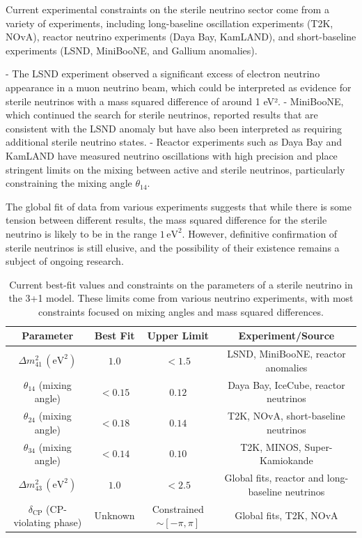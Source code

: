 \documentclass[a4paper,12pt,numbered]{article}
\begin{document}
Current experimental constraints on the sterile neutrino sector come from a variety of experiments, including long-baseline oscillation experiments (T2K, NOvA), reactor neutrino experiments (Daya Bay, KamLAND), and short-baseline experiments (LSND, MiniBooNE, and Gallium anomalies). 

- The LSND experiment observed a significant excess of electron neutrino appearance in a muon neutrino beam, which could be interpreted as evidence for sterile neutrinos with a mass squared difference of around 1 eV².
- MiniBooNE, which continued the search for sterile neutrinos, reported results that are consistent with the LSND anomaly but have also been interpreted as requiring additional sterile neutrino states.
- Reactor experiments such as Daya Bay and KamLAND have measured neutrino oscillations with high precision and place stringent limits on the mixing between active and sterile neutrinos, particularly constraining the mixing angle \( \theta_{14} \).

The global fit of data from various experiments suggests that while there is some tension between different results, the mass squared difference for the sterile neutrino is likely to be in the range \( 1 \, \text{eV}^2 \). However, definitive confirmation of sterile neutrinos is still elusive, and the possibility of their existence remains a subject of ongoing research.

\begin{table}[h!]
\centering
\begin{tabular}{|c|c|c|c|}
\hline
\textbf{Parameter} & \textbf{Best Fit} & \textbf{Upper Limit} & \textbf{Experiment/Source} \\
\hline
\(\Delta m^2_{41} \, (\text{eV}^2)\) & \(1.0 \) & \(< 1.5\) & LSND, MiniBooNE, reactor anomalies \cite{LSND, MiniBooNE} \\
\hline
\(\theta_{14}\) (mixing angle) & \( < 0.15 \) & \( 0.12 \) & Daya Bay, IceCube, reactor neutrinos \cite{DayaBay, IceCube} \\
\hline
\(\theta_{24}\) (mixing angle) & \( < 0.18 \) & \( 0.14 \) & T2K, NOvA, short-baseline neutrinos \cite{T2K, NOvA} \\
\hline
\(\theta_{34}\) (mixing angle) & \( < 0.14 \) & \( 0.10 \) & T2K, MINOS, Super-Kamiokande \cite{T2K, MINOS, SuperK} \\
\hline
\(\Delta m^2_{43} \, (\text{eV}^2)\) & \( 1.0 \) & \( < 2.5 \) & Global fits, reactor and long-baseline neutrinos \cite{Fogli_2012, DayaBay} \\
\hline
\(\delta_{\text{CP}}\) (CP-violating phase) & Unknown & Constrained \(\sim [-\pi, \pi]\) & Global fits, T2K, NOvA \cite{T2K_2023, NOvA} \\
\hline
\end{tabular}
\caption{Current best-fit values and constraints on the parameters of a sterile neutrino in the 3+1 model. These limits come from various neutrino experiments, with most constraints focused on mixing angles and mass squared differences.}
\label{tab:sterile_constraints}
\end{table}
\end{document}

